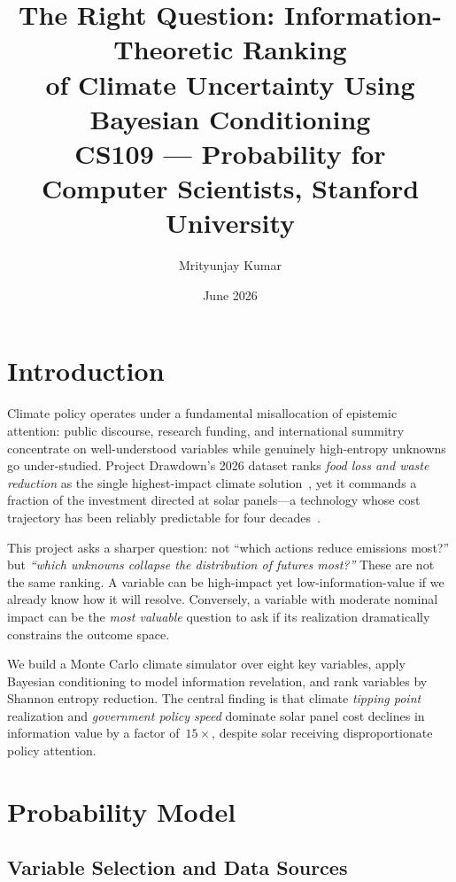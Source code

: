 \documentclass[10pt,twocolumn]{article}
\title{\textbf{The Right Question: Information-Theoretic Ranking\\
of Climate Uncertainty Using Bayesian Conditioning}\\[4pt]
{\normalsize CS109 --- Probability for Computer Scientists, Stanford University}}
\author{Mrityunjay Kumar}
\date{June 2026}
\begin{document}
\maketitle
\thispagestyle{empty}

\section{Introduction}

Climate policy operates under a fundamental misallocation of epistemic
attention: public discourse, research funding, and international summitry
concentrate on well-understood variables while genuinely high-entropy
unknowns go under-studied.  Project Drawdown's 2026 dataset ranks
\emph{food loss and waste reduction} as the single highest-impact climate
solution~\cite{drawdown2026}, yet it commands a fraction of the
investment directed at solar panels---a technology whose cost trajectory
has been reliably predictable for four decades~\cite{owid_energy}.

This project asks a sharper question: not ``which actions reduce
emissions most?'' but \emph{``which unknowns collapse the distribution
of futures most?''}  These are not the same ranking.  A variable can be
high-impact yet low-information-value if we already know how it will
resolve.  Conversely, a variable with moderate nominal impact can be the
\emph{most valuable} question to ask if its realization dramatically
constrains the outcome space.

We build a Monte Carlo climate simulator over eight key variables, apply
Bayesian conditioning to model information revelation, and rank variables
by Shannon entropy reduction.  The central finding is that climate
\emph{tipping point} realization and \emph{government policy speed}
dominate solar panel cost declines in information value by a factor
of~$15\times$, despite solar receiving disproportionate policy attention.

\section{Probability Model}

\subsection{Variable Selection and Data Sources}
\end{document}
